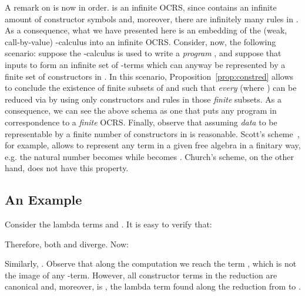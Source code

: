 \documentclass{LMCS}
\newcounter{number}
\begin{document}
A remark on  is now in order.  is an infinite OCRS, since  contains
an infinite amount of constructor symbols and, moreover, there are infinitely many
rules in . As a consequence, what we have presented here is an embedding
of the (weak, call-by-value) -calculus into an infinite OCRS. Consider, now,
the following scenario: suppose the -calculus is used to write a \emph{program} ,
and suppose that inputs to  form an infinite set of -terms  which can 
anyway be represented by a finite set of constructors in . In this scenario,
Proposition~\ref{prop:constred} allows to conclude the existence of finite
subsets of  and  such that \emph{every} 
(where ) can be reduced via  by using only
constructors and rules in those \emph{finite} subsets. As a consequence, we can see the
above schema as one that puts any program  
in correspondence to a \emph{finite} OCRS. Finally, observe that assuming \emph{data} to
be representable by a finite number of constructors in  is reasonable.
Scott's scheme~\cite{Wadsworth80}, for example, allows to represent any term in a given
free algebra in a finitary way, e.g. the natural number  becomes
 while
 becomes .
Church's scheme, on the other hand, does not have this property.
\subsection{An Example}
Consider the lambda terms 
and . It is easy to
verify that:

Therefore, both  and  diverge. Now:

Similarly, . Observe
that along the computation we reach the term , which is not the image of any -term. However, all constructor terms in the reduction are canonical and, moreover,
 is , 
the lambda term found along the reduction from  to .
\end{document}
